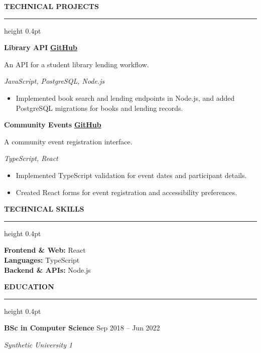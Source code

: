 \documentclass[10pt,a4paper]{article}
\newcommand{\atsSectionToSection}{9pt}
\newcommand{\atsHeadingToContent}{3pt}
\newcommand{\atsEntryToEntry}{5pt}
\newcommand{\atsProjectTitleToTech}{1.5pt}
\newcommand{\atsProjectTechToBullets}{2.5pt}
\newcommand{\atsRoleToMetadata}{1.5pt}
\newcommand{\atsBulletToBullet}{1.2pt}
\newcommand{\atssection}[1]{%
  \vspace{\atsSectionToSection}%
  {\noindent\large\bfseries\uppercase{#1}}\par
  \vspace{1.5pt}\hrule height 0.4pt\vspace{\atsHeadingToContent}%
}
\begin{document}
\atssection{Technical Projects}
\textbf{Library API} \hfill {\small \href{https://github.com/synthetic-fixture/project-1}{\textbf{GitHub}}}\par
An API for a student library lending workflow.\par
\vspace{\atsProjectTitleToTech}
{\textit{JavaScript, PostgreSQL, Node.js}}\par
\vspace{\atsProjectTechToBullets}
\begin{itemize}
\setlength{\itemsep}{\atsBulletToBullet}\setlength{\parskip}{0pt}\setlength{\parsep}{0pt}\setlength{\topsep}{0pt}\setlength{\partopsep}{0pt}
  \item Implemented book search and lending endpoints in Node.js, and added PostgreSQL migrations for books and lending records.
\end{itemize}
\vspace{\atsEntryToEntry}
\textbf{Community Events} \hfill {\small \href{https://github.com/synthetic-fixture/project-2}{\textbf{GitHub}}}\par
A community event registration interface.\par
\vspace{\atsProjectTitleToTech}
{\textit{TypeScript, React}}\par
\vspace{\atsProjectTechToBullets}
\begin{itemize}
\setlength{\itemsep}{\atsBulletToBullet}\setlength{\parskip}{0pt}\setlength{\parsep}{0pt}\setlength{\topsep}{0pt}\setlength{\partopsep}{0pt}
  \item Implemented TypeScript validation for event dates and participant details.
  \item Created React forms for event registration and accessibility preferences.
\end{itemize}

\atssection{Technical Skills}
\textbf{Frontend \& Web:} React\\
\textbf{Languages:} TypeScript\\
\textbf{Backend \& APIs:} Node.js\par

\atssection{Education}
\textbf{BSc in Computer Science} \hfill Sep 2018 -- Jun 2022\par
\vspace{\atsRoleToMetadata}
{\small\textit{Synthetic University 1}}\par
\end{document}
